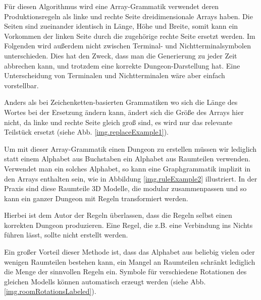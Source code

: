 Für diesen Algorithmus wird eine Array-Grammatik verwendet deren Produktionsregeln als linke und rechte Seite dreidimensionale Arrays haben. Die Seiten sind zueinander identisch in Länge, Höhe und Breite, somit kann ein Vorkommen der linken Seite durch die zugehörige rechte Seite ersetzt werden. Im Folgenden wird außerdem nicht zwischen Terminal- und Nichtterminalsymbolen unterschieden. Dies hat den Zweck, dass man die Generierung zu jeder Zeit abbrechen kann, und trotzdem eine korrekte Dungeon-Darstellung hat. Eine Unterscheidung von Terminalen und Nichtterminalen wäre aber einfach vorstellbar.



Anders als bei Zeichenketten-basierten Grammatiken wo sich die Länge des Wortes bei der Ersetzung ändern kann, ändert sich die Größe des Arrays hier nicht, da linke und rechte Seite gleich groß sind, es wird nur das relevante Teilstück ersetzt (siehe Abb. \ref{img.replaceExample1}).


Um mit dieser Array-Grammatik einen Dungeon zu erstellen müssen wir lediglich statt einem Alphabet aus Buchstaben ein Alphabet aus Raumteilen verwenden. Verwendet man ein solches Alphabet, so kann eine Graphgrammatik implizit in den Arrays enthalten sein, wie in Abbildung \ref{img.ruleExample2} illustriert. In der Praxis sind diese Raumteile 3D Modelle, die modular zusammenpassen und so kann ein ganzer Dungeon mit Regeln transformiert werden.

Hierbei ist dem Autor der Regeln überlassen, dass die Regeln selbst einen korrekten Dungeon produzieren. Eine Regel, die z.B. eine Verbindung ins Nichts führen lässt, sollte nicht erstellt werden. 


Ein großer Vorteil dieser Methode ist, dass das Alphabet aus beliebig vielen oder wenigen Raumteilen bestehen kann, ein Mangel an Raumteilen schränkt lediglich die Menge der sinnvollen Regeln ein. Symbole für verschiedene Rotationen des gleichen Modells können automatisch erzeugt werden (siehe Abb. \ref{img.roomRotationsLabeled}).

